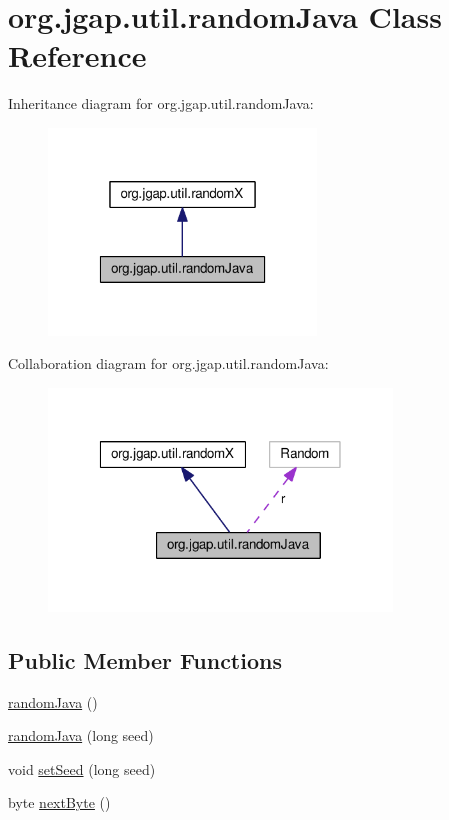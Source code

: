 \hypertarget{classorg_1_1jgap_1_1util_1_1random_java}{\section{org.\-jgap.\-util.\-random\-Java Class Reference}
\label{classorg_1_1jgap_1_1util_1_1random_java}
}


Inheritance diagram for org.\-jgap.\-util.\-random\-Java\-:
\nopagebreak
\begin{figure}[H]
\begin{center}
\leavevmode
\includegraphics[width=202pt]{classorg_1_1jgap_1_1util_1_1random_java__inherit__graph}
\end{center}
\end{figure}


Collaboration diagram for org.\-jgap.\-util.\-random\-Java\-:
\nopagebreak
\begin{figure}[H]
\begin{center}
\leavevmode
\includegraphics[width=259pt]{classorg_1_1jgap_1_1util_1_1random_java__coll__graph}
\end{center}
\end{figure}
\subsection*{Public Member Functions}
\begin{DoxyCompactItemize}
\item 
\hyperlink{classorg_1_1jgap_1_1util_1_1random_java_a7c255c661081e69d30992c71a45ffe1f}{random\-Java} ()
\item 
\hyperlink{classorg_1_1jgap_1_1util_1_1random_java_a7533cc47be105c5ca38a112d1e32d3e8}{random\-Java} (long seed)
\item 
void \hyperlink{classorg_1_1jgap_1_1util_1_1random_java_ab5e6e6caaf0d6e58b9d9d7daa1500c21}{set\-Seed} (long seed)
\item 
byte \hyperlink{classorg_1_1jgap_1_1util_1_1random_java_a964a6603268d4d76c95c82e4a3b48955}{next\-Byte} ()
\end{DoxyCompactItemize}
